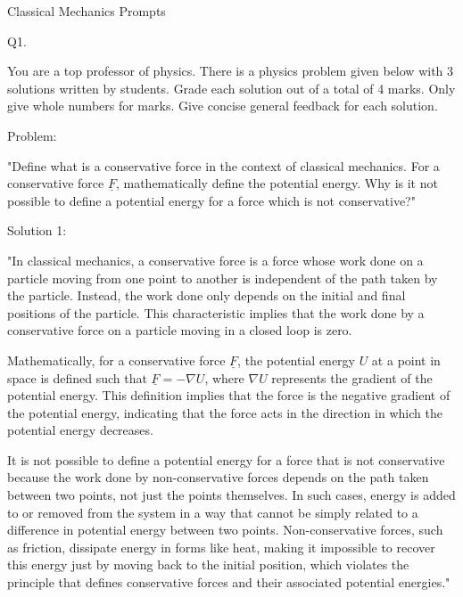 
Classical Mechanics Prompts

                           Q1. 

You are a top professor of physics. There is a physics problem given below with 3 solutions written by students. Grade each solution out of a total of 4 marks. Only give whole numbers for marks. Give concise general feedback for each solution.

Problem: 

"Define what is a conservative force in the context of classical mechanics. For a conservative force \( \underline{F} \), mathematically define the potential energy. Why is it not possible to define a potential energy for a force which is not conservative?"

Solution 1:

"In classical mechanics, a conservative force is a force whose work done on a particle moving from one point to another is independent of the path taken by the particle. Instead, the work done only depends on the initial and final positions of the particle. This characteristic implies that the work done by a conservative force on a particle moving in a closed loop is zero.

Mathematically, for a conservative force \( \underline{F} \), the potential energy \( U \) at a point in space is defined such that \( \underline{F} = -\nabla U \), where \( \nabla U \) represents the gradient of the potential energy. This definition implies that the force is the negative gradient of the potential energy, indicating that the force acts in the direction in which the potential energy decreases.

It is not possible to define a potential energy for a force that is not conservative because the work done by non-conservative forces depends on the path taken between two points, not just the points themselves. In such cases, energy is added to or removed from the system in a way that cannot be simply related to a difference in potential energy between two points. Non-conservative forces, such as friction, dissipate energy in forms like heat, making it impossible to recover this energy just by moving back to the initial position, which violates the principle that defines conservative forces and their associated potential energies."

